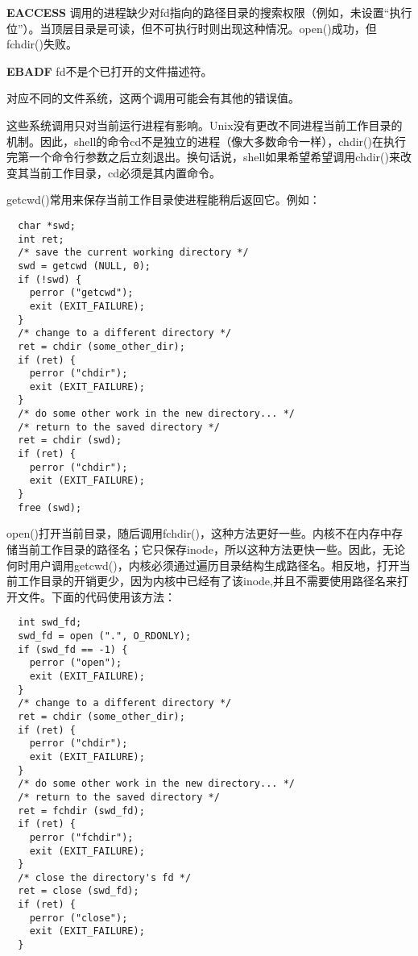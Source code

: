 \begin{eqlist*}
\item[\textbf{EACCESS}] 调用的进程缺少对fd指向的路径目录的搜索权限（例如，未设置“执行位”）。当顶层目录是可读，但不可执行时则出现这种情况。open()成功，但fchdir()失败。
\item[\textbf{EBADF}] fd不是个已打开的文件描述符。
\end{eqlist*}

对应不同的文件系统，这两个调用可能会有其他的错误值。

这些系统调用只对当前运行进程有影响。Unix没有更改不同进程当前工作目录的机制。因此，shell的命令cd不是独立的进程（像大多数命令一样），chdir()在执行完第一个命令行参数之后立刻退出。换句话说，shell如果希望希望调用chdir()来改变其当前工作目录，cd必须是其内置命令。

getcwd()常用来保存当前工作目录使进程能稍后返回它。例如：

\begin{lstlisting}
  char *swd;
  int ret;
  /* save the current working directory */
  swd = getcwd (NULL, 0);
  if (!swd) {
    perror ("getcwd");
    exit (EXIT_FAILURE);
  }
  /* change to a different directory */
  ret = chdir (some_other_dir);
  if (ret) {
    perror ("chdir");
    exit (EXIT_FAILURE);
  }
  /* do some other work in the new directory... */
  /* return to the saved directory */
  ret = chdir (swd);
  if (ret) {
    perror ("chdir");
    exit (EXIT_FAILURE);
  }
  free (swd);
\end{lstlisting}

open()打开当前目录，随后调用fchdir()，这种方法更好一些。内核不在内存中存储当前工作目录的路径名；它只保存inode，所以这种方法更快一些。因此，无论何时用户调用getcwd()，内核必须通过遍历目录结构生成路径名。相反地，打开当前工作目录的开销更少，因为内核中已经有了该inode,并且不需要使用路径名来打开文件。下面的代码使用该方法：

\begin{lstlisting}
  int swd_fd;
  swd_fd = open (".", O_RDONLY);
  if (swd_fd == -1) {
    perror ("open");
    exit (EXIT_FAILURE);
  }
  /* change to a different directory */
  ret = chdir (some_other_dir);
  if (ret) {
    perror ("chdir");
    exit (EXIT_FAILURE);
  }
  /* do some other work in the new directory... */
  /* return to the saved directory */
  ret = fchdir (swd_fd);
  if (ret) {
    perror ("fchdir");
    exit (EXIT_FAILURE);
  }
  /* close the directory's fd */
  ret = close (swd_fd);
  if (ret) {
    perror ("close");
    exit (EXIT_FAILURE);
  }
\end{lstlisting}

